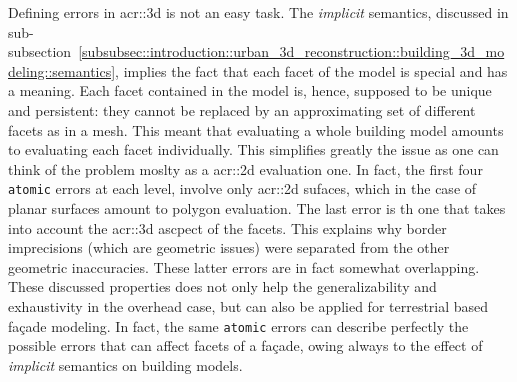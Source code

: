             Defining errors in \gls{acr::3d} is not an easy task.
            The \textit{implicit} semantics, discussed in sub-subsection~\ref{subsubsec::introduction::urban_3d_reconstruction::building_3d_modeling::semantics}, implies the fact that each facet of the model is special and has a meaning.
            Each facet contained in the model is, hence, supposed to be unique and persistent: they cannot be replaced by an approximating set of different facets as in a mesh.
            This meant that evaluating a whole building model amounts to evaluating each facet individually.
            This simplifies greatly the issue as one can think of the problem moslty as a \gls{acr::2d} evaluation one.
            In fact, the first four \texttt{atomic} errors at each level, involve only \gls{acr::2d} sufaces, which in the case of planar surfaces amount to polygon evaluation.
            The last error is th one that takes into account the \gls{acr::3d} ascpect of the facets.
            This explains why border imprecisions (which are geometric issues) were separated from the other geometric inaccuracies.
            These latter errors are in fact somewhat overlapping.
            These discussed properties does not only help the generalizability and exhaustivity in the overhead case, but can also be applied for terrestrial based fa\c{c}ade modeling.
            In fact, the same \texttt{atomic} errors can describe perfectly the possible errors that can affect facets of a fa\c{c}ade, owing always to the effect of \textit{implicit} semantics on building models.
        
